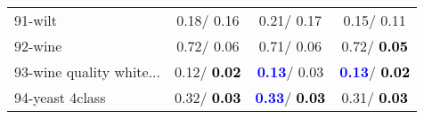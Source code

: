 \begin{table}[h]
\begin{center}
\begin{tabular}{lc|c|c}
91-wilt &   0.18/  0.16 &   0.21/  0.17 &   0.15/  0.11 \\
92-wine &   0.72/  0.06 &   0.71/  0.06 &   0.72/\textcolor{black}{\textbf{  0.05}} \\ \hline
93-wine quality white... &   0.12/\textcolor{black}{\textbf{  0.02}} & \textcolor{blue}{\textbf{  0.13}}/  0.03 & \textcolor{blue}{\textbf{  0.13}}/\textcolor{black}{\textbf{  0.02}} \\
94-yeast 4class &   0.32/\textcolor{black}{\textbf{  0.03}} & \textcolor{blue}{\textbf{  0.33}}/\textcolor{black}{\textbf{  0.03}} &   0.31/\textcolor{black}{\textbf{  0.03}} \\\end{tabular}\label{stratsALCKappa2bC4.5wRedux}
\end{center}
\end{table}